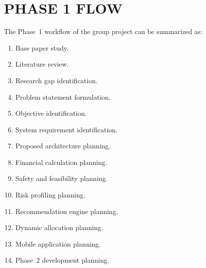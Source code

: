 \chapter{\uppercase{Phase 1 Flow}}
The Phase~1 workflow of the group project can be summarized as:
\begin{enumerate}
	\item Base paper study.
	\item Literature review.
	\item Research gap identification.
	\item Problem statement formulation.
	\item Objective identification.
	\item System requirement identification.
	\item Proposed architecture planning.
	\item Financial calculation planning.
	\item Safety and feasibility planning.
	\item Risk profiling planning.
	\item Recommendation engine planning.
	\item Dynamic allocation planning.
	\item Mobile application planning.
	\item Phase~2 development planning.
\end{enumerate}
